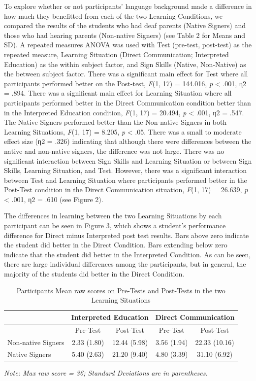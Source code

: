 \documentclass[11.5pt]{sig-alternate} %
\begin{document}
\begin{large}
To explore whether or not participants’ language background made a difference in how much they benefitted from each of the two Learning Conditions, we compared the results of the students who had deaf parents (Native Signers) and those who had hearing parents (Non-native Signers) (see Table 2 for Means and SD). A repeated measures ANOVA was used with Test (pre-test, post-test) as the repeated measure, Learning Situation (Direct Communication; Interpreted Education) as the within subject factor, and Sign Skills (Native, Non-Native) as the between subject factor. There was a significant main effect for Test where all participants performed better on the Post-test, \textit{F}(1, 17) = 144.016, \textit{p} < .001, η2 = .894. There was a significant main effect for Learning Situation where all participants performed better in the Direct Communication condition better than in the Interpreted Education condition, \textit{F}(1, 17) = 20.494, \textit{p} < .001, η2 = .547. The Native Signers performed better than the Non-native Signers in both Learning Situations, \textit{F}(1, 17) = 8.205, \textit{p} < .05. There was a small to moderate effect size (η2 = .326) indicating that although there were differences between the native and non-native signers, the difference was not large. There was no significant interaction between Sign Skills and Learning Situation or between Sign Skills, Learning Situation, and Test. However, there was a significant interaction between Test and Learning Situation where participants performed better in the Post-Test condition in the Direct Communication situation, \textit{F}(1, 17) = 26.639, \textit{p} < .001, η2 = .610 (see Figure 2). 

The differences in learning between the two Learning Situations by each participant can be seen in Figure 3, which shows a student’s performance difference for Direct minus Interpreted post test results.  Bars above zero indicate the student did better in the Direct Condition.  Bars extending below zero indicate that the student did better in the Interpreted Condition.  As can be seen, there are large individual differences among the participants, but in general, the majority of the students did better in the Direct Condition.

\begin{table}[th]
\caption{Participants Mean raw scores on Pre-Tests and Post-Tests in the two Learning Situations}
\begin{tabular}{lcccc}
\hline
& \multicolumn{2}{c}{Interpreted Education} & \multicolumn{2}{c}{Direct Communication} \\ \hline
& Pre-Test & Post-Test & Pre-Test & Post-Test \\
Non-native Signers & 2.33 (1.80) & 12.44 (5.98) & 3.56 (1.94) & 22.33 (10.16) \\
Native Signers & 5.40 (2.63) & 21.20 (9.40) & 4.80 (3.39) & 31.10 (6.92) \\ \hline
\end{tabular}
\textit{Note: Max raw score = 36; Standard Deviations are in parentheses.} 
\end{table}


\end{large}
\end{document}

